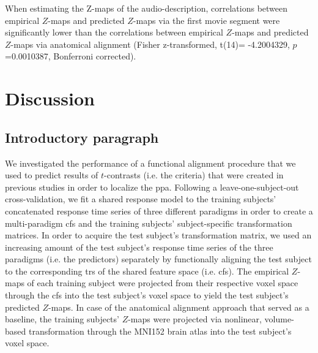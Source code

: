 
%
When estimating the Z-maps of the audio-description, correlations between
empirical $Z$-maps and predicted $Z$-maps via the first movie segment were
significantly lower than the correlations between empirical $Z$-maps and
predicted $Z$-maps via anatomical alignment (Fisher z-transformed, t(14)=
-4.2004329, $p$=0.0010387, Bonferroni corrected).









\pagebreak


\section{Discussion}






\subsection{Introductory paragraph}

%
We investigated the performance of a functional alignment procedure that we used
to predict results of $t$-contrasts (i.e. the criteria) that were created in
previous studies \citep{sengupta2016extension, haeusler2022processing} in order
to localize the \ac{ppa}.
%
Following a leave-one-subject-out cross-validation, we fit a shared response
model \citep{chen2015reduced} to the training subjects' concatenated response
time series of three different paradigms in order to create a multi-paradigm
\ac{cfs} and the training subjects' subject-specific transformation matrices.
%
In order to acquire the test subject's transformation matrix, we used an
increasing amount of the test subject's response time series of the three
paradigms (i.e. the predictors)  separately by functionally aligning the test
subject to the corresponding \acp{tr} of the shared feature space (i.e.
\ac{cfs}).
%
The empirical $Z$-maps of each training subject were projected from their
respective voxel space through the \ac{cfs} into the test subject's voxel space
to yield the test subject's predicted $Z$-maps.
%
In case of the anatomical alignment approach that served as a baseline, the
training subjects' $Z$-maps were projected via nonlinear, volume-based
transformation through the MNI152 brain atlas into the test subject's voxel
space.


